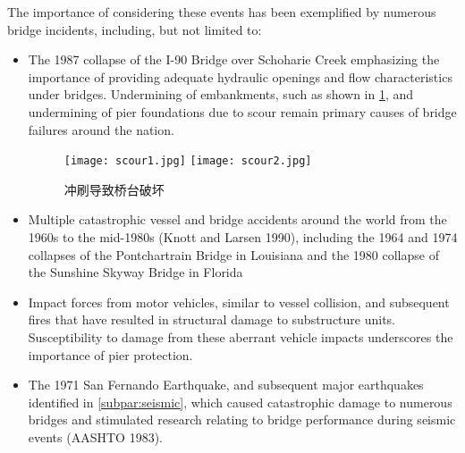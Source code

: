 The importance of considering these events has been exemplified by numerous bridge incidents, including, but not limited to:
\begin{itemize}
  \item The 1987 collapse of the I-90 Bridge over Schoharie Creek emphasizing the importance of providing adequate hydraulic openings and flow characteristics under bridges. Undermining of embankments, such as
  shown in \cref{fig:scour-undermining-abutment}, and undermining of pier foundations due to scour remain primary causes of bridge
  failures around the nation.
  \begin{figure}
    \texttt{[image: scour1.jpg]}\hfill
    \texttt{[image: scour2.jpg]}
    \caption{冲刷导致桥台破坏}
    \label{fig:scour-undermining-abutment}
  \end{figure}
  \item  Multiple catastrophic vessel and bridge accidents around the world from the 1960s to the mid-1980s (Knott and Larsen 1990), including the 1964 and 1974 collapses of the Pontchartrain Bridge in Louisiana and the 1980 collapse of the Sunshine Skyway Bridge in Florida
  \item Impact forces from motor vehicles, similar to vessel collision, and subsequent fires that have resulted in structural damage to substructure units. Susceptibility to damage from these aberrant vehicle impacts
  underscores the importance of pier protection.
  \item The 1971 San Fernando Earthquake, and subsequent major earthquakes identified in \cref{subpar:seismic}, which caused catastrophic damage to numerous bridges and stimulated research relating to bridge performance during seismic events (AASHTO 1983).
\end{itemize}

